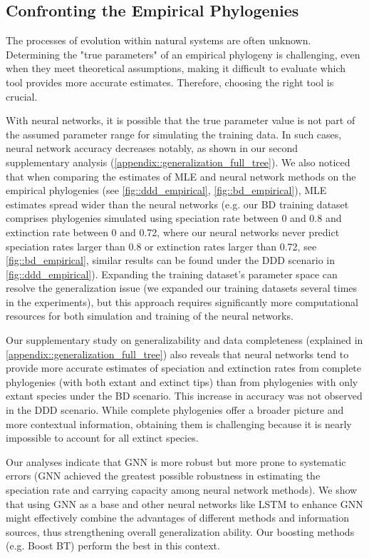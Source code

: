{\subsection{Confronting the Empirical Phylogenies}
\label{ch2::sec::discussion::confront_empirical_trees}
The processes of evolution within natural systems are often unknown. Determining the "true parameters" of an empirical phylogeny is challenging, even when they meet theoretical assumptions, making it difficult to evaluate which tool provides more accurate estimates. Therefore, choosing the right tool is crucial. 

With neural networks, it is possible that the true parameter value is not part of the assumed parameter range for simulating the training data. In such cases, neural network accuracy decreases notably, as shown in our second supplementary analysis (\autoref{appendix::generalization_full_tree}). We also noticed that when comparing the estimates of MLE and neural network methods on the empirical phylogenies (see \autoref{fig::ddd_empirical}, \autoref{fig::bd_empirical}), MLE estimates spread wider than the neural networks (e.g. our BD training dataset comprises phylogenies simulated using speciation rate between 0 and 0.8 and extinction rate between 0 and 0.72, where our neural networks never predict speciation rates larger than 0.8 or extinction rates larger than 0.72, see \autoref{fig::bd_empirical}, similar results can be found under the DDD scenario in \autoref{fig::ddd_empirical}). Expanding the training dataset's parameter space can resolve the generalization issue (we expanded our training datasets several times in the experiments), but this approach requires significantly more computational resources for both simulation and training of the neural networks. 

Our supplementary study on generalizability and data completeness (explained in \autoref{appendix::generalization_full_tree}) also reveals that neural networks tend to provide more accurate estimates of speciation and extinction rates from complete phylogenies (with both extant and extinct tips) than from phylogenies with only extant species under the BD scenario. This increase in accuracy was not observed in the DDD scenario. While complete phylogenies offer a broader picture and more contextual information, obtaining them is challenging because it is nearly impossible to account for all extinct species. 

Our analyses indicate that GNN is more robust but more prone to systematic errors (GNN achieved the greatest possible robustness in estimating the speciation rate and carrying capacity among neural network methods). We show that using GNN as a base and other neural networks like LSTM to enhance GNN might effectively combine the advantages of different methods and information sources, thus strengthening overall generalization ability. Our boosting methods (e.g. Boost BT) perform the best in this context.

}
